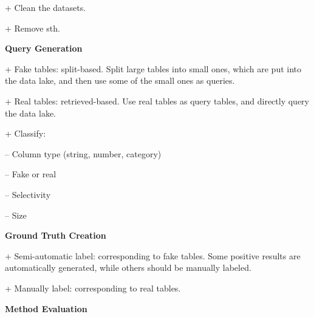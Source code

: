 + Clean the datasets.

+ Remove sth.



\noindent\textbf{Query Generation}

+ Fake tables: split-based. Split large tables into small ones, which are put into the data lake, and then use some of the small ones as queries.

+ Real tables: retrieved-based. Use real tables as query tables, and directly query the data lake.


+ Classify: 

\quad\quad -- Column type (string, number, category)
 
\quad\quad -- Fake or real
  
\quad\quad -- Selectivity

\quad\quad -- Size

\noindent\textbf{Ground Truth Creation}

+ Semi-automatic label: corresponding to fake tables. Some positive results are automatically generated, while others should be manually labeled.

+ Manually label: corresponding to real tables.

\noindent\textbf{Method Evaluation} 


